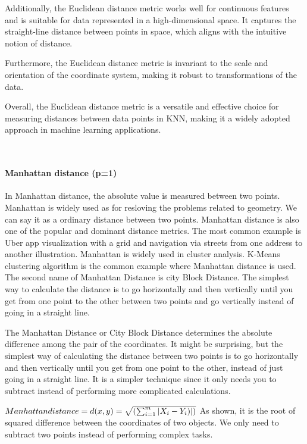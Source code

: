 \documentclass[conference]{IEEEtran}
\begin{document}
Additionally, the Euclidean distance metric works well for continuous features and is suitable for data represented in a high-dimensional space. It captures the straight-line distance between points in space, which aligns with the intuitive notion of distance.

Furthermore, the Euclidean distance metric is invariant to the scale and orientation of the coordinate system, making it robust to transformations of the data.

Overall, the Euclidean distance metric is a versatile and effective choice for measuring distances between data points in KNN, making it a widely adopted approach in machine learning applications.





\



\paragraph{\textbf{Manhattan distance (p=1)}}
In Manhattan distance, the absolute value is measured between two points. Manhattan is widely used as for resloving the problems related to geometry. We can say it as a ordinary distance between two points. Manhattan distance is also one of the popular and dominant distance metrics. The most common example is Uber app visualization with a grid and navigation via streets from one address to another illustration. Manhattan is widely used in cluster analysis. K-Means clustering algorithm is the common example where Manhattan distance is used. The second name of Manhattan Distance is city Block Distance. The simplest way to calculate the distance is to go horizontally and then vertically until you get from one point to the other between two points and go vertically instead of going in a straight line. 

The Manhattan Distance or City Block Distance determines the absolute difference among the pair of the coordinates. It might be surprising, but the simplest way of calculating the distance between two points is to go horizontally and then vertically until you get from one point to the other, instead of just going in a straight line. It is a simpler technique since it only needs you to subtract instead of performing more complicated calculations.

\begin{math}
 Manhattan distance = d(x,y)=\sqrt{(\sum_{i=1}^{m} |X_{i} - Y_{i})|)}
 \newline
\end{math}
As shown, it is the root of squared difference between the coordinates of two objects. We only need to subtract two points instead of performing complex tasks. 
\end{document}
